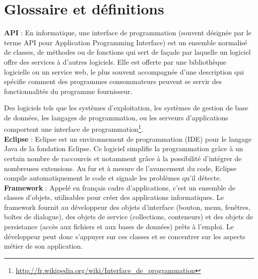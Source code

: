 \chapter{Glossaire et définitions}
\label{Glossaire}

\textbf{API} : En informatique, une interface de programmation (souvent désignée par le terme API pour Application Programming Interface) est un ensemble normalisé de classes, de méthodes ou de fonctions qui sert de façade par laquelle un logiciel offre des services à d'autres logiciels. Elle est offerte par une bibliothèque logicielle ou un service web, le plus souvent accompagnée d'une description qui spécifie comment des programmes consommateurs peuvent se servir des fonctionnalités du programme fournisseur.

Des logiciels tels que les systèmes d'exploitation, les systèmes de gestion de base de données, les langages de programmation, ou les serveurs d'applications comportent une interface de programmation\footnote{\url{http://fr.wikipedia.org/wiki/Interface_de_programmation}}.\\

\textbf{Eclipse} :  Eclipse est un environnement de programmation (IDE) pour le langage Java de la fondation Eclipse. Ce logiciel simplifie la programmation grâce à un certain nombre de raccourcis et notamment grâce à la possibilité d'intégrer de nombreuses extensions. Au fur et à mesure de l'avancement du code, Eclipse compile automatiquement le code et signale les problèmes qu'il détecte.\\

\textbf{Framework} : Appelé en français cadre d'applications, c'est un ensemble de classes d'objets, utilisables pour créer des applications informatiques. Le framework fournit au développeur des objets d'interface (bouton, menu, fenêtres, boîtes de dialogue), des objets de service (collections, conteneurs) et des objets de persistance (accès aux fichiers et aux bases de données) prêts à l'emploi. Le développeur peut donc s'appuyer sur ces classes et se concentrer sur les aspects métier de son application.\\

\pagebreak

